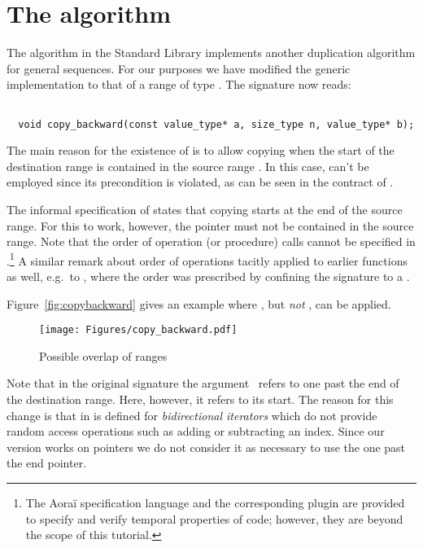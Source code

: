 
\section{The \copybackward algorithm}

The \copybackward  algorithm in the \cxx Standard Library \cite[\S 28.6.1]{cxx-17-draft} implements
another duplication algorithm for general sequences.
For our purposes we have modified
the generic implementation
to that of a range of type .
The signature now reads:

\begin{lstlisting}[style=acsl-block]

  void copy_backward(const value_type* a, size_type n, value_type* b);
\end{lstlisting}

The main reason for the existence of \copybackward is to allow
copying when the start of the destination range  is contained
in the source range .
In this case, \copyi can't be employed since its precondition
 is violated, as can be seen in the contract of .

The informal specification of \copybackward states that copying
starts at the end of the source range.
For this to work, however, the pointer  must not be contained
in the source range.
Note that the order of operation (or procedure) calls cannot be
specified in \acsl.\footnote{
       The \textsf{Aoraï} specification language and the
       corresponding \framac plugin are provided to specify and verify
       temporal properties of code; however, they are beyond the scope
       of this tutorial.
}
A similar remark about order of operations tacitly applied
to earlier functions
as well, e.g.\ to \copyi, where the \cxx order was prescribed by confining
the signature to a .


Figure~\ref{fig:copybackward} gives an example where \copybackward, but \emph{not} \copyi,
can be applied.

\begin{figure}[hbt]
\centering
\texttt{[image: Figures/copy\_backward.pdf]}
\caption{ Possible overlap of \copybackward ranges}
\end{figure}

Note that in the original signature the argument~ refers to one 
past the end of the destination range.
Here, however, it refers to its start.
The reason for this change is that in \cxx \copybackward is defined
for \emph{bidirectional iterators} which do not provide
random access operations such as adding or subtracting an index.
Since our \isoc version works on pointers we do not consider it
as necessary to use the one past the end pointer.

